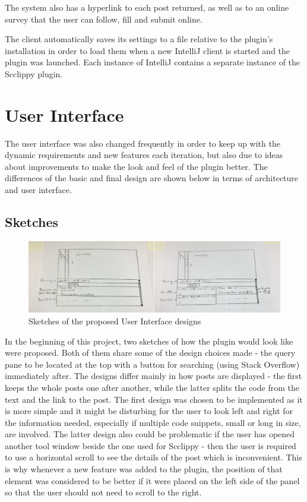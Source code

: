 \documentclass{l4proj}
\begin{document}
The system also has a hyperlink to each post returned, as well as to an online survey that the user can follow, fill and submit online. 

The client automatically saves its settings to a file relative to the plugin's installation in order to load them when a new IntelliJ client is started and the plugin was launched. Each instance of IntelliJ contains a separate instance of the Scclippy plugin.

\section{User Interface}
The user interface was also changed frequently in order to keep up with the dynamic requirements and new features each iteration, but also due to ideas about improvements to make the look and feel of the plugin better. The differences of the basic and final design are shown below in terms of architecture and user interface.

\subsection{Sketches}

\begin{figure}[H]
\includegraphics[scale=0.2]{sketches}
\centering
\caption{Sketches of the proposed User Interface designs}\label{sketches}
\label{fig:sketches}
\end{figure}

In the beginning of this project, two sketches of how the plugin would look like were proposed. Both of them share some of the design choices made - the query pane to be located at the top with a button for searching (using Stack Overflow) immediately after. The designs differ mainly in how posts are displayed - the first keeps the whole posts one after another, while the latter splits the code from the text and the link to the post. The first design was chosen to be implemented as it is more simple and it might be disturbing for the user to look left and right for the information needed, especially if multiple code snippets, small or long in size, are involved. The latter design also could be problematic if the user has opened another tool window beside the one used for Scclippy - then the user is required to use a horizontal scroll to see the details of the post which is inconvenient. This is why whenever a new feature was added to the plugin, the position of that element was considered to be better if it were placed on the left side of the panel so that the user should not need to scroll to the right.
\end{document}
